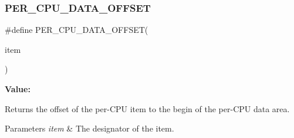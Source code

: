 \subsubsection{\texorpdfstring{PER\_CPU\_DATA\_OFFSET}{PER\_CPU\_DATA\_OFFSET}}
{\footnotesize\ttfamily \#define P\+E\+R\+\_\+\+C\+P\+U\+\_\+\+D\+A\+T\+A\+\_\+\+O\+F\+F\+S\+ET(\begin{DoxyParamCaption}\item[{}]{item }\end{DoxyParamCaption})}

{\bfseries Value\+:}
\begin{DoxyCode}{0}

\end{DoxyCode}


Returns the offset of the per-\/\+C\+PU item to the begin of the per-\/\+C\+PU data area. 


\begin{DoxyParams}{Parameters}
{\em item} & The designator of the item. \\
\hline
\end{DoxyParams}
